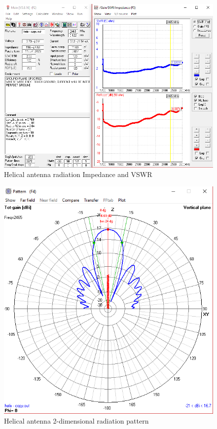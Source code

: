 \begin{figure}[h!]
\centering
\includegraphics[scale=0.57]{figures/HelicalAntennaImpedanceVSWR.PNG}
\caption{Helical antenna radiation Impedance and VSWR}
\end{figure}

\begin{figure}[h!]
\centering
\includegraphics[scale=0.57]{figures/HelicalAntennaRadiationPattern.PNG}
\caption{Helical antenna 2-dimensional radiation pattern}
\end{figure}

